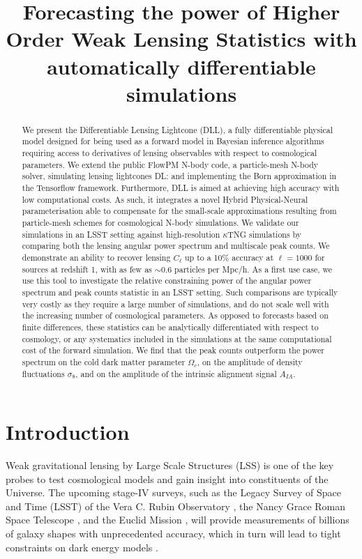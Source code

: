 \documentclass[twocolumn,twocolappendix]{aastex63}
\newcommand{\denise}[1]{{\color{red}DL: #1}}
\begin{document}
\title{Forecasting the power of Higher Order Weak Lensing Statistics with automatically differentiable simulations}


\begin{abstract}
We present the Differentiable Lensing Lightcone (DLL), a fully differentiable physical model designed for being used as a forward model in Bayesian inference algorithms requiring access to derivatives of lensing observables with respect to cosmological parameters. 
We extend the public FlowPM N-body code, a particle-mesh N-body solver, simulating lensing lightcones \denise{and implementing the Born approximation} in the Tensorflow framework. Furthermore, DLL is aimed at achieving high accuracy with low computational costs. As such, it integrates a novel Hybrid Physical-Neural parameterisation able to compensate for the small-scale approximations resulting from particle-mesh schemes for cosmological N-body simulations.
We validate our simulations in an LSST setting against high-resolution $\kappa$TNG simulations by comparing both the lensing angular power spectrum and multiscale peak counts. We demonstrate an ability to recover lensing $C_\ell$ up to a 10\% accuracy at $\ell=1000$ for sources at redshift 1, with as few as $\sim 0.6$ particles per Mpc/h. 
As a first use case, we use this tool to investigate the relative constraining power of the angular power spectrum and peak counts statistic in an LSST setting.
Such comparisons are typically very costly as they require a large number of simulations, and do not scale well with the increasing number of cosmological parameters.  
As opposed to forecasts based on finite differences, these statistics can be analytically differentiated with respect to cosmology, or any systematics included in the simulations at the same computational cost of the forward simulation. We find that the peak counts outperform the power spectrum on the cold dark matter parameter $\Omega_c$, on the amplitude of density fluctuations $\sigma_8$, and on the
amplitude of the intrinsic alignment signal $A_{IA}$.
\end{abstract}





\section{Introduction}
Weak gravitational lensing by Large Scale Structures (LSS) is one of the key probes to test cosmological models and gain insight into constituents of the Universe. The upcoming stage-IV surveys, such as the Legacy Survey of Space and Time (LSST) of the Vera C. Rubin Observatory \citep{ivezic2019lsst}, the Nancy Grace Roman Space Telescope \citep{spergel2015wide}, and  the Euclid Mission \citep{laureijs2011euclid}, will provide measurements of billions of galaxy shapes with unprecedented accuracy, which in turn will lead to tight constraints on dark energy models \citep[e.g.][]{mandelbaum2018lsst}.
\end{document}
